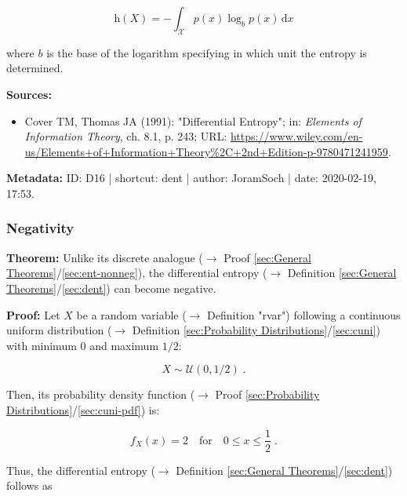 \documentclass[a4paper,12pt]{book}
\begin{document}
\begin{equation} \label{eq:dent-dent}
\mathrm{h}(X) = - \int_{\mathcal{X}} p(x) \log_b p(x) \, \mathrm{d}x
\end{equation}

where $b$ is the base of the logarithm specifying in which unit the entropy is determined.

\vspace{1em}
\textbf{Sources:}
\begin{itemize}
\item Cover TM, Thomas JA (1991): "Differential Entropy"; in: \textit{Elements of Information Theory}, ch. 8.1, p. 243; URL: \url{https://www.wiley.com/en-us/Elements+of+Information+Theory%2C+2nd+Edition-p-9780471241959}.
\end{itemize}


\vspace{1em}
\textbf{Metadata:} ID: D16 | shortcut: dent | author: JoramSoch | date: 2020-02-19, 17:53.


\subsubsection[\textbf{Negativity}]{Negativity} \label{sec:dent-neg}

\vspace{1em}
\textbf{Theorem:} Unlike its discrete analogue ($\rightarrow$ Proof \ref{sec:General Theorems}/\ref{sec:ent-nonneg}), the differential entropy ($\rightarrow$ Definition \ref{sec:General Theorems}/\ref{sec:dent}) can become negative.


\vspace{1em}
\textbf{Proof:} Let $X$ be a random variable ($\rightarrow$ Definition "rvar") following a continuous uniform distribution ($\rightarrow$ Definition \ref{sec:Probability Distributions}/\ref{sec:cuni}) with minimum $0$ and maximum $1/2$:

\begin{equation} \label{eq:dent-neg-X}
X \sim \mathcal{U}(0, 1/2) \; .
\end{equation}

Then, its probability density function ($\rightarrow$ Proof \ref{sec:Probability Distributions}/\ref{sec:cuni-pdf}) is:

\begin{equation} \label{eq:dent-neg-X-pdf}
f_X(x) = 2 \quad \text{for} \quad 0 \leq x \leq \frac{1}{2} \; .
\end{equation}

Thus, the differential entropy ($\rightarrow$ Definition \ref{sec:General Theorems}/\ref{sec:dent}) follows as
\end{document}
